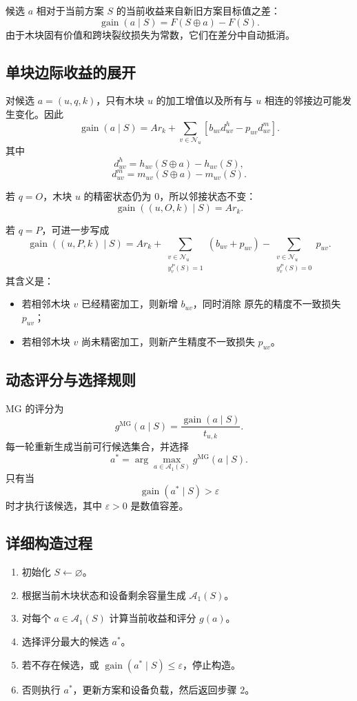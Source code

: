 \documentclass[UTF8,12pt,a4paper]{ctexart}
\newcommand{\Alg}[1]{\textsc{#1}}
\newcommand{\Aone}{\mathcal{A}_{1}}
\newcommand{\N}{\mathcal{N}}
\newcommand{\score}{g}
\newcommand{\eps}{\varepsilon}
\begin{document}
候选 \(a\) 相对于当前方案 \(S\) 的当前收益来自新旧方案目标值之差：
\[
\boxed{
\operatorname{gain}(a\mid S)
=
F(S\oplus a)-F(S)
}.
\]
由于木块固有价值和跨块裂纹损失为常数，它们在差分中自动抵消。

\subsection{单块边际收益的展开}

对候选 \(a=(u,q,k)\)，只有木块 \(u\) 的加工增值以及所有与 \(u\)
相连的邻接边可能发生变化。因此
\[
\boxed{
\operatorname{gain}(a\mid S)
=
A r_k
+
\sum_{v\in\N_u}
\left[
b_{uv}d^h_{uv}
-
p_{uv}d^m_{uv}
\right]
}.
\]
其中
\[
d^h_{uv}
=
h_{uv}(S\oplus a)-h_{uv}(S),
\]
\[
d^m_{uv}
=
m_{uv}(S\oplus a)-m_{uv}(S).
\]

若 \(q=O\)，木块 \(u\) 的精密状态仍为 \(0\)，所以邻接状态不变：
\[
\boxed{
\operatorname{gain}((u,O,k)\mid S)=A r_k
}.
\]

若 \(q=P\)，可进一步写成
\[
\boxed{
\operatorname{gain}((u,P,k)\mid S)
=
A r_k
+
\sum_{\substack{v\in\N_u\\y_v^P(S)=1}}
\left(b_{uv}+p_{uv}\right)
-
\sum_{\substack{v\in\N_u\\y_v^P(S)=0}}
p_{uv}
}.
\]
其含义是：
\begin{itemize}
  \item 若相邻木块 \(v\) 已经精密加工，则新增 \(b_{uv}\)，同时消除
        原先的精度不一致损失 \(p_{uv}\)；
  \item 若相邻木块 \(v\) 尚未精密加工，则新产生精度不一致损失
        \(p_{uv}\)。
\end{itemize}

\subsection{动态评分与选择规则}

\Alg{MG} 的评分为
\[
\boxed{
\score^{\mathrm{MG}}(a\mid S)
=
\frac{\operatorname{gain}(a\mid S)}{t_{u,k}}
}.
\]
每一轮重新生成当前可行候选集合，并选择
\[
\boxed{
a^*
=
\arg\max_{a\in\Aone(S)}
\score^{\mathrm{MG}}(a\mid S)
}.
\]
只有当
\[
\operatorname{gain}(a^*\mid S)>\eps
\]
时才执行该候选，其中 \(\eps>0\) 是数值容差。

\subsection{详细构造过程}

\begin{enumerate}
  \item 初始化 \(S\leftarrow\varnothing\)。
  \item 根据当前木块状态和设备剩余容量生成 \(\Aone(S)\)。
  \item 对每个 \(a\in\Aone(S)\) 计算当前收益和评分 \(g(a)\)。
  \item 选择评分最大的候选 \(a^*\)。
  \item 若不存在候选，或 \(\operatorname{gain}(a^*\mid S)\leq\eps\)，停止构造。
  \item 否则执行 \(a^*\)，更新方案和设备负载，然后返回步骤 2。
\end{enumerate}
\end{document}

